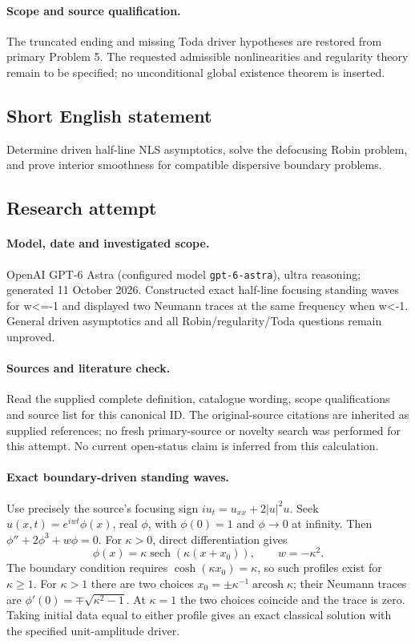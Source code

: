 \documentclass[11pt]{article}
\begin{document}
\paragraph{Scope and source qualification.}The truncated ending and missing Toda driver hypotheses are restored from primary Problem 5. The requested admissible nonlinearities and regularity theory remain to be specified; no unconditional global existence theorem is inserted.
\subsection{Short English statement}
Determine driven half-line NLS asymptotics, solve the defocusing Robin problem, and prove interior smoothness for compatible dispersive boundary problems.
\subsection{Research attempt}
\paragraph{Model, date and investigated scope.}
OpenAI GPT-6 Astra (configured model \texttt{gpt-6-astra}), ultra reasoning; generated 11 October 2026. Constructed exact half-line focusing standing waves for w<=-1 and displayed two Neumann traces at the same frequency when w<-1. General driven asymptotics and all Robin/regularity/Toda questions remain unproved.

\paragraph{Sources and literature check.}
Read the supplied complete definition, catalogue wording, scope qualifications and source list for this canonical ID. The original-source citations are inherited as supplied references; no fresh primary-source or novelty search was performed for this attempt. No current open-status claim is inferred from this calculation.

\paragraph{Exact boundary-driven standing waves.}Use precisely the source's focusing sign \(iu_t=u_{xx}+2|u|^2u\). Seek \(u(x,t)=e^{iwt}\phi(x)\), real \(\phi\), with \(\phi(0)=1\) and \(\phi\to0\) at infinity. Then \(\phi''+2\phi^3+w\phi=0\). For \(\kappa>0\), direct differentiation gives
\[\phi(x)=\kappa\operatorname{sech}(\kappa(x+x_0)),\qquad w=-\kappa^2.
\]
The boundary condition requires \(\cosh(\kappa x_0)=\kappa\), so such profiles exist for \(\kappa\ge1\). For \(\kappa>1\) there are two choices \(x_0=\pm\kappa^{-1}\operatorname{arcosh}\kappa\); their Neumann traces are \(\phi'(0)=\mp\sqrt{\kappa^2-1}\). At \(\kappa=1\) the two choices coincide and the trace is zero. Taking initial data equal to either profile gives an exact classical solution with the specified unit-amplitude driver.
\end{document}
